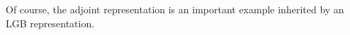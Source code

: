 \documentclass[reqno,a4paper,oneside]{amsart}
\theoremstyle{plain}
\theoremstyle{remark}
\theoremstyle{definition}
\def\bas#1\eas{\begin{align*}#1\end{align*}}
\begin{document}
%


Of course, the adjoint representation is an important example inherited by an LGB representation.
\end{document}
